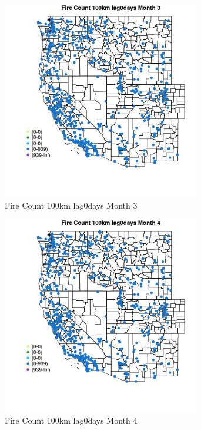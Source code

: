 \begin{figure} 
\centering  
\includegraphics[width=0.77\textwidth]{Code_Outputs/Report_ML_input_PM25_Step4_part_e_de_duplicated_aves_compiled_2019-05-21wNAs_MapObsMo3Fire_Count_100km_lag0days.jpg} 
\caption{\label{fig:Report_ML_input_PM25_Step4_part_e_de_duplicated_aves_compiled_2019-05-21wNAsMapObsMo3Fire_Count_100km_lag0days}Fire Count 100km lag0days Month 3} 
\end{figure} 
 

\clearpage 

\begin{figure} 
\centering  
\includegraphics[width=0.77\textwidth]{Code_Outputs/Report_ML_input_PM25_Step4_part_e_de_duplicated_aves_compiled_2019-05-21wNAs_MapObsMo4Fire_Count_100km_lag0days.jpg} 
\caption{\label{fig:Report_ML_input_PM25_Step4_part_e_de_duplicated_aves_compiled_2019-05-21wNAsMapObsMo4Fire_Count_100km_lag0days}Fire Count 100km lag0days Month 4} 
\end{figure} 
 

